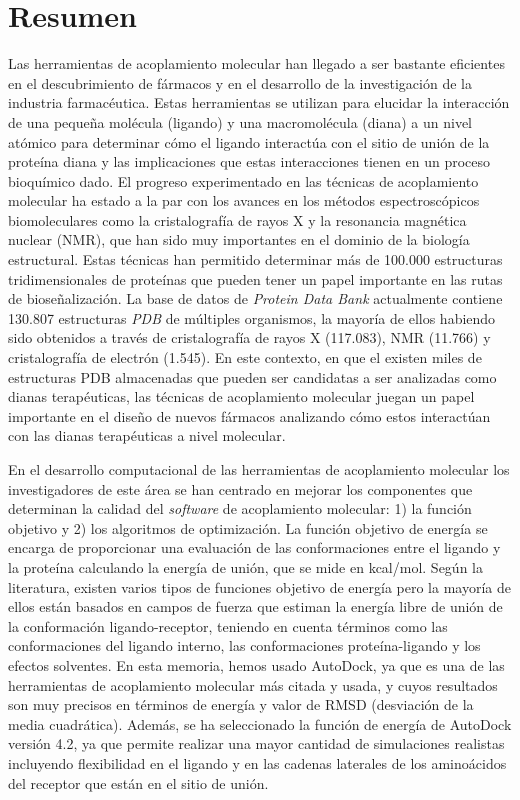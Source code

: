 \chapter*{Resumen}
\label{chapter:Resumen}

Las herramientas de acoplamiento molecular han llegado a ser bastante eficientes en el descubrimiento de fármacos y en el desarrollo de la investigación de la industria farmacéutica. Estas herramientas se utilizan para elucidar la interacción de una pequeña molécula (ligando) y una macromolécula (diana) a un nivel atómico para determinar cómo el ligando interactúa con el sitio de unión de la proteína diana y las implicaciones que estas interacciones tienen en un proceso bioquímico dado. El progreso experimentado en las técnicas de acoplamiento molecular ha estado a la par con los avances en los métodos espectroscópicos biomoleculares como la cristalografía de rayos X y la resonancia magnética nuclear (NMR), que han sido muy importantes en el dominio de la biología estructural. Estas técnicas han permitido determinar más de 100.000 estructuras tridimensionales de proteínas que pueden tener un papel importante en las rutas de bioseñalización. La base de datos de \emph{Protein Data Bank} actualmente contiene 130.807 estructuras \emph{PDB} de múltiples organismos, la mayoría de ellos habiendo sido obtenidos a través de cristalografía de rayos X (117.083), NMR (11.766) y cristalografía de electrón (1.545). En este contexto, en que el existen miles de estructuras PDB almacenadas que pueden ser candidatas a ser analizadas como dianas terapéuticas, las técnicas de acoplamiento molecular juegan un papel importante en el diseño de nuevos fármacos analizando cómo estos interactúan con las dianas terapéuticas a nivel molecular.

En el desarrollo computacional de las herramientas de acoplamiento molecular los investigadores de este área se han centrado en mejorar los componentes que determinan la calidad del \emph{software} de acoplamiento molecular: 1) la función objetivo y 2) los algoritmos de optimización. La función objetivo de energía se encarga de proporcionar una evaluación de las conformaciones entre el ligando y la proteína calculando la energía de unión, que se mide en kcal/mol. Según la literatura, existen varios tipos de funciones objetivo de energía pero la mayoría de ellos están basados en campos de fuerza que estiman la energía libre de unión de la conformación ligando-receptor, teniendo en cuenta términos como las conformaciones del ligando interno, las conformaciones proteína-ligando y los efectos solventes. En esta memoria, hemos usado AutoDock, ya que es una de las herramientas de acoplamiento molecular más citada y usada, y cuyos resultados son muy precisos en términos de energía y valor de RMSD (desviación de la media cuadrática). Además, se ha seleccionado la función de energía de AutoDock versión 4.2, ya que permite realizar una mayor cantidad de simulaciones realistas incluyendo flexibilidad en el ligando y en las cadenas laterales de los aminoácidos del receptor que están en el sitio de unión.

